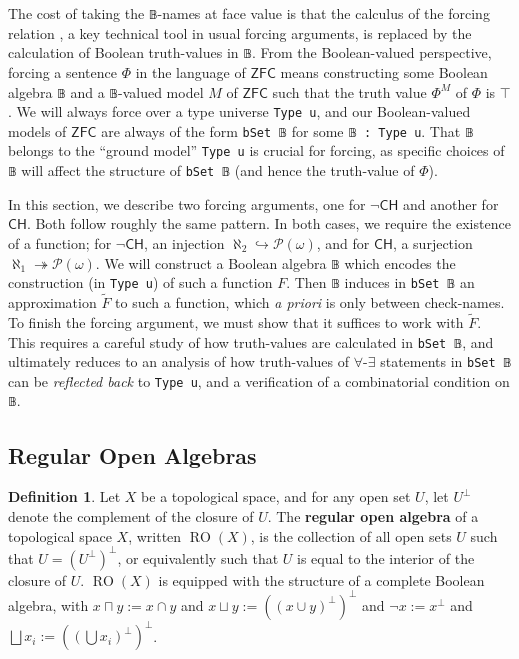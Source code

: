 \documentclass[sigplan,screen]{acmart}
\newcommand{\lil}{\lstinline}
\newcommand{\ZFC}{\mathsf{ZFC}}
\newcommand{\CH}{\mathsf{CH}}
\theoremstyle{definition}
\newtheorem{defn}{Definition}[section]
\begin{document}
The cost of taking the \lstinline{𝔹}-names at face value is that the calculus of the forcing relation \cite{shoenfield1971unramified}, a key technical tool in usual forcing arguments, is replaced by the calculation of Boolean truth-values in \lstinline{𝔹}.
From the Boolean-valued perspective, forcing a sentence \(\Phi\) in the language of \(\ZFC\) means constructing some Boolean algebra \lil{𝔹} and a \lil{𝔹}-valued model \(M\) of \(\ZFC\) such that the truth value \(\Phi^{M}\) of \(\Phi\) is \(\top\).
We will always force over a type universe \lil{Type u}, and our Boolean-valued models of \(\ZFC\) are always of the form \lil{bSet 𝔹} for some \lil{𝔹 : Type u}.
That \lil{𝔹} belongs to the ``ground model'' \lil{Type u} is crucial for forcing, as specific choices of \lil{𝔹} will affect the structure of \lil{bSet 𝔹} (and hence the truth-value of \(\Phi\)). %

In this section, we describe two forcing arguments, one for \(\neg \CH\) and another for \(\CH\).
Both follow roughly the same pattern. In both cases, we require the existence of a function; for \(\neg \CH\), an injection \(\aleph_2 \hookrightarrow \mathcal{P}(\omega)\), and for \(\CH\), a surjection \(\aleph_1 \twoheadrightarrow \mathcal{P}(\omega)\).
We will construct a Boolean algebra \lil{𝔹} which encodes the construction (in \lil{Type u}) of such a function \(F\).
Then \lil{𝔹} induces in \lil{bSet 𝔹} an approximation \(\widetilde{F}\) to such a function, which \emph{a priori} is only between check-names.
To finish the forcing argument, we must show that it suffices to work with \(\widetilde{F}\).
This requires a careful study of how truth-values are calculated in \lil{bSet 𝔹},
and ultimately reduces to an analysis of how truth-values of \(\forall\)-\(\exists\) statements in \lil{bSet 𝔹} can be \emph{reflected back} to \lil{Type u}, and a verification of a combinatorial condition on \lil{𝔹}.

\subsection{Regular Open Algebras}
\begin{defn}\label{def:regular-open-algebra}
  Let $X$ be a topological space, and for any open set $U$, let $U^{\perp}$ denote the complement of the closure of $U$.
  The \textbf{regular open algebra} of a topological space $X$, written $\operatorname{RO}(X)$, is the collection of all open sets $U$ such that $U = (U^\perp)^\perp$, or equivalently such that
  $U$ is equal to the interior of the closure of $U$.
  $\operatorname{RO}(X)$ is equipped with the structure of a complete Boolean algebra, with $x \sqcap y := x \cap y$ and $x \sqcup y := ((x \cup y)^\perp)^\perp$ and $\neg x := x^\perp$ and $\bigsqcup x_i := ((\bigcup x_i)^\perp)^\perp$.
\end{defn}
\end{document}
